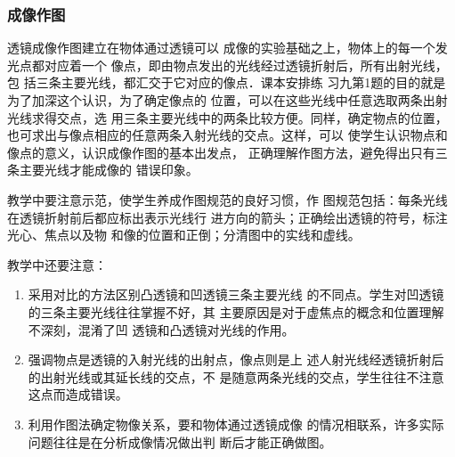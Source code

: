 \subsubsection{成像作图}

透镜成像作图建立在物体通过透镜可以
成像的实验基础之上，物体上的每一个发光点都对应着一个
像点，即由物点发出的光线经过透镜折射后，所有出射光线，包
括三条主要光线，都汇交于它对应的像点．课本安排练
习九第1题的目的就是为了加深这个认识，为了确定像点的
位置，可以在这些光线中任意选取两条出射光线求得交点，选
用三条主要光线中的两条比较方便。同样，确定物点的位置，
也可求出与像点相应的任意两条入射光线的交点。这样，可以
使学生认识物点和像点的意义，认识成像作图的基本出发点，
正确理解作图方法，避免得出只有三条主要光线才能成像的
错误印象。

教学中要注意示范，使学生养成作图规范的良好习惯，作
图规范包括：每条光线在透镜折射前后都应标出表示光线行
进方向的箭头；正确绘出透镜的符号，标注光心、焦点以及物
和像的位置和正倒；分清图中的实线和虚线。

教学中还要注意：
\begin{enumerate}
\item 采用对比的方法区别凸透镜和凹透镜三条主要光线
的不同点。学生对凹透镜的三条主要光线往往掌握不好，其
主要原因是对于虚焦点的概念和位置理解不深刻，混淆了凹
透镜和凸透镜对光线的作用。
\item 强调物点是透镜的入射光线的出射点，像点则是上
述人射光线经透镜折射后的出射光线或其延长线的交点，不
是随意两条光线的交点，学生往往不注意这点而造成错误。
\item 利用作图法确定物像关系，要和物体通过透镜成像
的情况相联系，许多实际问题往往是在分析成像情况做出判
断后才能正确做图。
\end{enumerate}

































